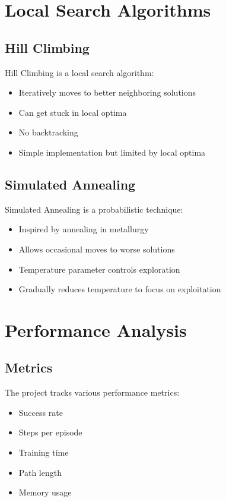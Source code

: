 \documentclass[12pt,a4paper]{article}
\begin{document}
\section{Local Search Algorithms}

\subsection{Hill Climbing}
Hill Climbing is a local search algorithm:

\begin{itemize}
    \item Iteratively moves to better neighboring solutions
    \item Can get stuck in local optima
    \item No backtracking
    \item Simple implementation but limited by local optima
\end{itemize}

\subsection{Simulated Annealing}
Simulated Annealing is a probabilistic technique:

\begin{itemize}
    \item Inspired by annealing in metallurgy
    \item Allows occasional moves to worse solutions
    \item Temperature parameter controls exploration
    \item Gradually reduces temperature to focus on exploitation
\end{itemize}

\section{Performance Analysis}

\subsection{Metrics}
The project tracks various performance metrics:

\begin{itemize}
    \item Success rate
    \item Steps per episode
    \item Training time
    \item Path length
    \item Memory usage
\end{itemize}
\end{document}
